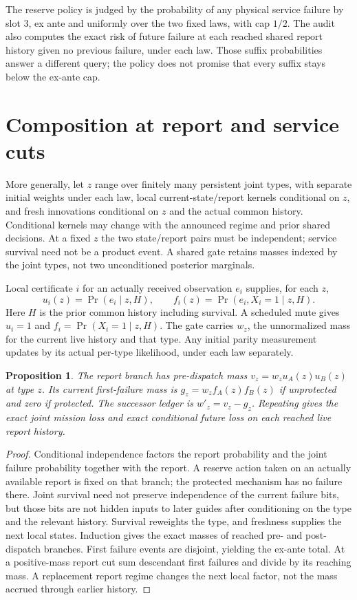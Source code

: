 \documentclass[11pt]{article}
\newtheorem{proposition}{Proposition}
\begin{document}
The reserve policy is judged by the probability of any physical service failure by slot 3, ex ante and uniformly over the two fixed laws, with cap $1/2$. The audit also computes the exact risk of future failure at each reached shared report history given no previous failure, under each law. Those suffix probabilities answer a different query; the policy does not promise that every suffix stays below the ex-ante cap.

\section{Composition at report and service cuts}
More generally, let $z$ range over finitely many persistent joint types, with separate initial weights under each law, local current-state/report kernels conditional on $z$, and fresh innovations conditional on $z$ and the actual common history. Conditional kernels may change with the announced regime and prior shared decisions. At a fixed $z$ the two state/report pairs must be independent; service survival need not be a product event. A shared gate retains masses indexed by the joint types, not two unconditioned posterior marginals.

Local certificate $i$ for an actually received observation $e_i$ supplies, for each $z$,
\[
 u_i(z)=\Pr(e_i\mid z,H),\qquad
 f_i(z)=\Pr(e_i,X_i=1\mid z,H).
\]
Here $H$ is the prior common history including survival. A scheduled mute gives $u_i=1$ and $f_i=\Pr(X_i=1\mid z,H)$. The gate carries $w_z$, the unnormalized mass for the current live history and that type. Any initial parity measurement updates by its actual per-type likelihood, under each law separately.

\begin{proposition}
The report branch has pre-dispatch mass $v_z=w_z u_A(z)u_B(z)$ at type $z$. Its current first-failure mass is $g_z=w_z f_A(z)f_B(z)$ if unprotected and zero if protected. The successor ledger is $w'_z=v_z-g_z$. Repeating gives the exact joint mission loss and exact conditional future loss on each reached live report history.
\end{proposition}
\begin{proof}
Conditional independence factors the report probability and the joint failure probability together with the report. A reserve action taken on an actually available report is fixed on that branch; the protected mechanism has no failure there. Joint survival need not preserve independence of the current failure bits, but those bits are not hidden inputs to later guides after conditioning on the type and the relevant history. Survival reweights the type, and freshness supplies the next local states. Induction gives the exact masses of reached pre- and post-dispatch branches. First failure events are disjoint, yielding the ex-ante total. At a positive-mass report cut sum descendant first failures and divide by its reaching mass. A replacement report regime changes the next local factor, not the mass accrued through earlier history.
\end{proof}
\end{document}
